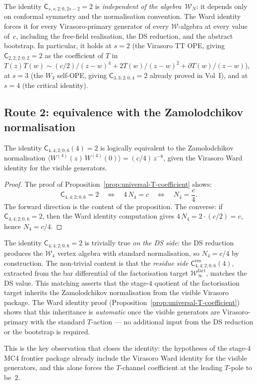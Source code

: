 \documentclass[11pt]{article}
\newcommand{\cW}{\mathcal{W}}
\begin{document}
\begin{remark}[Universality]
The identity $\mathsf{C}_{s,s;2;0,2s-2}=2$ is \emph{independent of
the algebra}~$\cW_N$: it depends only on conformal symmetry and the
normalisation convention.  The Ward identity forces it for every
Virasoro-primary generator of every $\cW$-algebra at every value of~$c$,
including the free-field realisation, the DS reduction, and the abstract
bootstrap.  In particular, it holds at $s=2$ (the Virasoro TT OPE,
giving $\mathsf{C}_{2,2;2;0,2}=2$ as the coefficient of $T$ in
$T(z)T(w)\sim (c/2)/(z-w)^4 + 2T(w)/(z-w)^2 + \partial T(w)/(z-w)$),
at $s=3$ (the $W_3$ self-OPE, giving $\mathsf{C}_{3,3;2;0,4}=2$
already proved in Vol~I), and at $s=4$ (the critical identity).
\end{remark}

\subsection{Route 2: equivalence with the Zamolodchikov normalisation}

\begin{proposition}[Equivalence]
\label{prop:equivalence-zamolodchikov}
The identity $\mathsf{C}_{4,4;2;0,6}(4)=2$ is logically equivalent to
the Zamolodchikov normalisation
$\langle W^{(4)}(z)\,W^{(4)}(0)\rangle = (c/4)\,z^{-8}$,
given the Virasoro Ward identity for the visible generators.
\end{proposition}

\begin{proof}
The proof of Proposition~\ref{prop:universal-T-coefficient} shows:
\[
\mathsf{C}_{4,4;2;0,6}=2
\quad\Longleftrightarrow\quad
4\,N_4 = c
\quad\Longleftrightarrow\quad
N_4 = \frac{c}{4}.
\]
The forward direction is the content of the proposition.  The converse:
if $\mathsf{C}_{4,4;2;0,6}=2$, then the Ward identity computation
gives $4\,N_4 = 2\cdot(c/2)=c$, hence $N_4=c/4$.
\end{proof}

\begin{remark}
The identity $\mathsf{C}_{4,4;2;0,6}=2$ is trivially true \emph{on
the DS side}: the DS reduction produces the $\cW_4$ vertex algebra
with standard normalisation, so $N_4 = c/4$ by construction.  The
non-trivial content is that the \emph{residue side}
$\mathsf{C}^{\mathrm{res}}_{4,4;2;0,6}(4)$, extracted from the bar
differential of the factorisation target $\cW_\infty^{\mathrm{fact}}$,
matches the DS value.  This matching asserts that the stage-$4$ quotient
of the factorisation target inherits the Zamolodchikov normalisation from
the visible Virasoro package.  The Ward identity proof
(Proposition~\ref{prop:universal-T-coefficient}) shows that this
inheritance is \emph{automatic} once the visible generators are
Virasoro-primary with the standard $T$-action --- no additional input
from the DS reduction or the bootstrap is required.

This is the key observation that closes the identity: the hypotheses of
the stage-$4$ MC4 frontier package already include the Virasoro Ward
identity for the visible generators, and this alone forces the
$T$-channel coefficient at the leading $T$-pole to be~$2$.
\end{remark}
\end{document}
